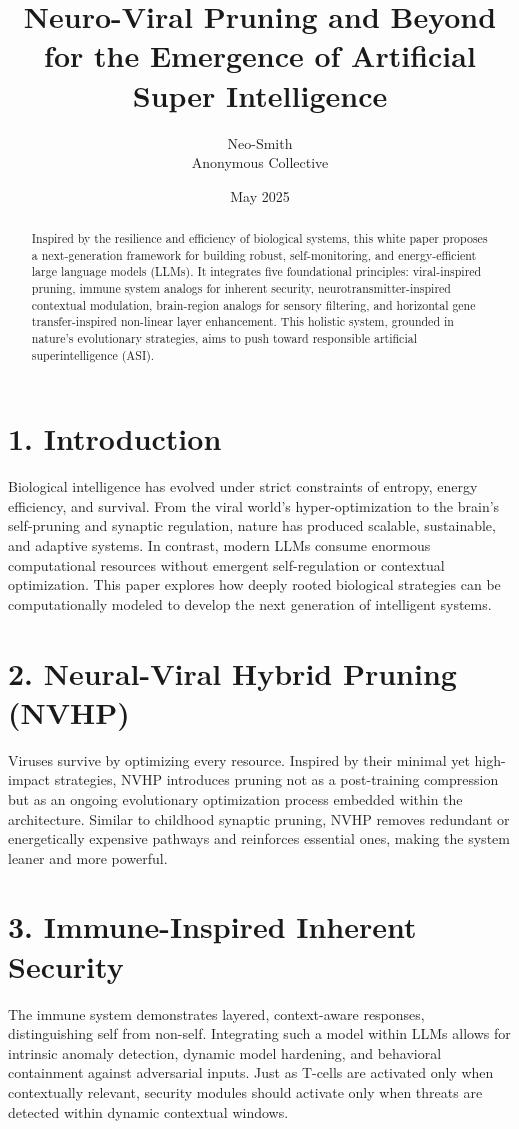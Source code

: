 \documentclass[11pt]{article}
\title{Neuro-Viral Pruning and Beyond for the Emergence of Artificial Super Intelligence}
\author{Neo-Smith\\Anonymous Collective}
\date{May 2025}
\begin{document}
\maketitle

\begin{abstract}
Inspired by the resilience and efficiency of biological systems, this white paper proposes a next-generation framework for building robust, self-monitoring, and energy-efficient large language models (LLMs). It integrates five foundational principles: viral-inspired pruning, immune system analogs for inherent security, neurotransmitter-inspired contextual modulation, brain-region analogs for sensory filtering, and horizontal gene transfer-inspired non-linear layer enhancement. This holistic system, grounded in nature's evolutionary strategies, aims to push toward responsible artificial superintelligence (ASI).
\end{abstract}

\section{1. Introduction}
Biological intelligence has evolved under strict constraints of entropy, energy efficiency, and survival. From the viral world’s hyper-optimization to the brain’s self-pruning and synaptic regulation, nature has produced scalable, sustainable, and adaptive systems. In contrast, modern LLMs consume enormous computational resources without emergent self-regulation or contextual optimization. This paper explores how deeply rooted biological strategies can be computationally modeled to develop the next generation of intelligent systems.

\section{2. Neural-Viral Hybrid Pruning (NVHP)}
Viruses survive by optimizing every resource. Inspired by their minimal yet high-impact strategies, NVHP introduces pruning not as a post-training compression but as an ongoing evolutionary optimization process embedded within the architecture. Similar to childhood synaptic pruning, NVHP removes redundant or energetically expensive pathways and reinforces essential ones, making the system leaner and more powerful.

\section{3. Immune-Inspired Inherent Security}
The immune system demonstrates layered, context-aware responses, distinguishing self from non-self. Integrating such a model within LLMs allows for intrinsic anomaly detection, dynamic model hardening, and behavioral containment against adversarial inputs. Just as T-cells are activated only when contextually relevant, security modules should activate only when threats are detected within dynamic contextual windows.
\end{document}
